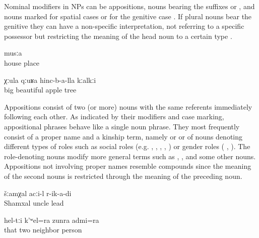 Nominal modifiers in NPs can be appositions, nouns bearing the suffixes  or , and nouns marked for spatial cases  or for the genitive case . If plural nouns bear the genitive they can have a non-specific interpretation, not referring to a specific possessor but restricting the meaning of the head noun to a certain type . 
%
\begin{exe}
		\ex	\label{ex:the place in front of his house@7a}
			musːa\\
				house	place\\
		\glt	{}
	
		\ex	\label{ex:a big beautiful apple tree@7b}
		\gll	χːula	qːuʁa	hinc-b-a-lla	kːalkːi\\
			big 	beautiful	apple	tree\\
		\glt	{}
\end{exe}

Appositions consist of two (or more) nouns with the same referents immediately following each other. As indicated by their modifiers and case marking, appositional phrases behave like a single noun phrase. They most frequently consist of a proper name and a kinship term, namely    or   or of nouns denoting different types of roles such as social roles (e.g.  ,  ,  ,  ,  )  or gender roles ( ,  ). The role-denoting nouns modify more general terms such as  ,   , and some other nouns. Appositions not involving proper names resemble compounds  since the meaning of the second nouns is restricted through the meaning of the preceding noun.
%
\begin{exe}
		\ex	\label{ex:Uncle Shamkhal guided me@8a}
		\gll	šːamχal	acːi-l	r-ik-a-di\\
			Shamxal	uncle	lead\\
		\glt	{}
	
		\ex	\label{ex:and those two neighbors@8b}
		\gll	hel-tːi	k'ʷel=ra	zunra	admi=ra\\
			that	two	neighbor	person\\
		\glt	{}
	
\end{exe}

